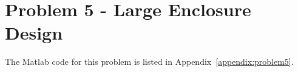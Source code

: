 {{%
%










\newpage
\section*{Problem 5 - Large Enclosure Design}

The Matlab code for this problem is listed in Appendix~\ref{appendix:problem5}.

}}
